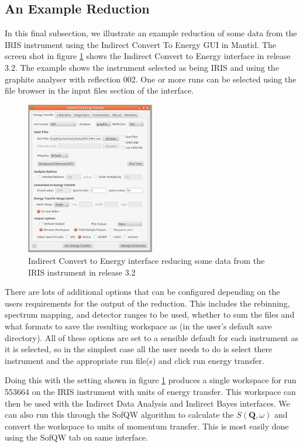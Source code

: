 \documentclass[paper=a4, fontsize=11pt]{scrartcl}	%
\numberwithin{equation}{section}															%
\numberwithin{figure}{section}																%
\numberwithin{table}{section}																%
\begin{document}
\subsection{An Example Reduction}
In this final subsection, we illustrate an example reduction of some data from the IRIS instrument using the Indirect Convert To Energy GUI in Mantid. The screen shot in figure \ref{fig:iris-c2e-reduction} shows the Indirect Convert to Energy interface in release 3.2. The example shows the instrument selected as being IRIS and using the graphite analyser with reflection 002. One or more runs can be selected using the file browser in the input files section of the interface.

\begin{figure}[H]
\centering
\includegraphics[width=0.5\textwidth]{img/iris-c2e-reduction.png}
\caption{Indirect Convert to Energy interface reducing some data from the IRIS instrument in release 3.2}
\label{fig:iris-c2e-reduction}
\end{figure}

There are lots of additional options that can be configured depending on the users requirements for the output of the reduction. This includes the rebinning, spectrum mapping, and detector ranges to be used, whether to sum the files and what formats to save the resulting workspace as (in the user's default save directory). All of these options are set to a sensible default for each instrument as it is selected, so in the simplest case all the user needs to do is select there instrument and the appropriate run file(s) and click run energy transfer.

Doing this with the setting shown in figure \ref{fig:iris-c2e-reduction} produces a single workspace for run 553664 on the IRIS instrument with units of energy transfer. This workspace can then be used with the Indirect Data Analysis and Indirect Bayes interfaces. We can also run this through the SofQW algorithm to calculate the $S(\mathbf{Q},\omega)$ and convert the workspace to units of momentum transfer. This is most easily done using the SofQW tab on same interface.
\end{document}
